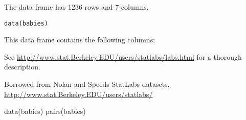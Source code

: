 \begin{Description}\relax
The  data frame has 1236 rows and 7 columns.
\end{Description}
\begin{Usage}
\begin{verbatim}data(babies)\end{verbatim}
\end{Usage}
\begin{Format}\relax
This data frame contains the following columns:
\end{Format}
\begin{Details}\relax
See \url{http://www.stat.Berkeley.EDU/users/statlabs/labs.html} for a thorough 
description.
\end{Details}
\begin{Source}\relax
Borrowed from Nolan and Speeds StatLabs
datasets. \url{http://www.stat.Berkeley.EDU/users/statlabs/}
\end{Source}
\begin{Examples}
\begin{ExampleCode}
data(babies)
pairs(babies)
\end{ExampleCode}
\end{Examples}

